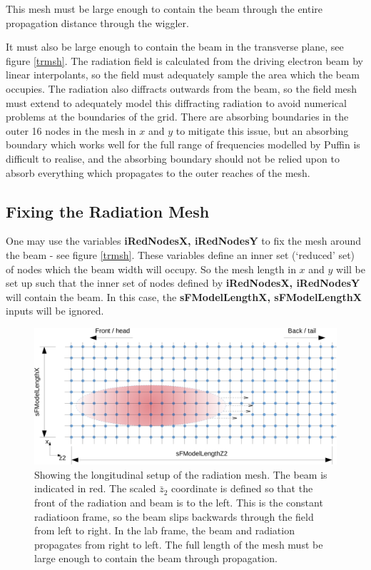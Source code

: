 \documentclass[12pt]{article}%
\begin{document}
This mesh must be large enough to contain the beam through the entire propagation distance through the wiggler.

It must also be large enough to contain the beam in the transverse plane, see figure \ref{trmsh}. The radiation field is calculated from the driving electron beam by linear interpolants, so the field must adequately sample the area which the beam occupies.  The radiation also diffracts outwards from the beam, so the field mesh must extend to adequately model this diffracting radiation to avoid numerical problems at the boundaries of the grid. There are absorbing boundaries in the outer 16 nodes in the mesh in $x$ and $y$ to mitigate this issue, but an absorbing boundary which works well for the full range of frequencies modelled by Puffin is difficult to realise, and the absorbing boundary should not be relied upon to absorb everything which propagates to the outer reaches of the mesh.

\subsection{Fixing the Radiation Mesh}

One may use the variables {\bf iRedNodesX, iRedNodesY} to fix the mesh around the beam - see figure \ref{trmsh}. These variables define an inner set (`reduced' set) of nodes which the beam width will occupy. So the mesh length in $x$ and $y$ will be set up such that the inner set of nodes defined by  {\bf iRedNodesX, iRedNodesY} will contain the beam. In this case, the {\bf sFModelLengthX, sFModelLengthX} inputs will be ignored.


\begin{figure}
\centering
\includegraphics[width=150mm]{long_mesh.png}
\caption{Showing the longitudinal setup of the radiation mesh. The beam is indicated in red. The scaled $\bar{z}_2$ coordinate is defined so that the front of the radiation and beam is to the left. This is the constant radiatioon frame, so the beam slips backwards through the field from left to right. In the lab frame, the beam and radiation propagates from right to left. The full length of the mesh must be large enough to contain the beam through propagation.}
\label{lgmsh}
\end{figure}
\end{document}
